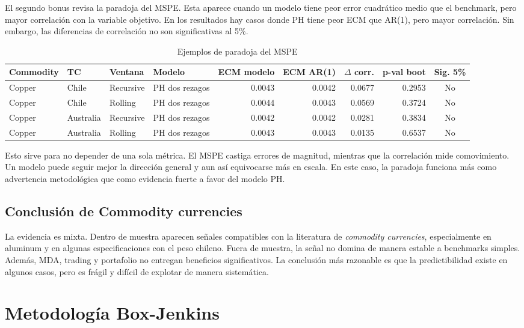 \documentclass[11pt,a4paper]{article}
\begin{document}
El segundo bonus revisa la paradoja del MSPE. Esta aparece cuando un modelo tiene peor error cuadrático medio que el benchmark, pero mayor correlación con la variable objetivo. En los resultados hay casos donde PH tiene peor ECM que AR(1), pero mayor correlación. Sin embargo, las diferencias de correlación no son significativas al 5\%.

\begin{table}[H]
\centering
\caption{Ejemplos de paradoja del MSPE}
\scriptsize
\begin{tabular}{llllrrrrc}
\toprule
Commodity & TC & Ventana & Modelo & ECM modelo & ECM AR(1) & $\Delta$ corr. & p-val boot & Sig. 5\% \\
\midrule
Copper & Chile & Recursive & PH dos rezagos & 0.0043 & 0.0042 & 0.0677 & 0.2953 & No \\
Copper & Chile & Rolling & PH dos rezagos & 0.0044 & 0.0043 & 0.0569 & 0.3724 & No \\
Copper & Australia & Recursive & PH dos rezagos & 0.0042 & 0.0042 & 0.0281 & 0.3834 & No \\
Copper & Australia & Rolling & PH dos rezagos & 0.0043 & 0.0043 & 0.0135 & 0.6537 & No \\
\bottomrule
\end{tabular}
\end{table}

Esto sirve para no depender de una sola métrica. El MSPE castiga errores de magnitud, mientras que la correlación mide comovimiento. Un modelo puede seguir mejor la dirección general y aun así equivocarse más en escala. En este caso, la paradoja funciona más como advertencia metodológica que como evidencia fuerte a favor del modelo PH.

\subsection{Conclusión de Commodity currencies}

La evidencia es mixta. Dentro de muestra aparecen señales compatibles con la literatura de \textit{commodity currencies}, especialmente en aluminum y en algunas especificaciones con el peso chileno. Fuera de muestra, la señal no domina de manera estable a benchmarks simples. Además, MDA, trading y portafolio no entregan beneficios significativos. La conclusión más razonable es que la predictibilidad existe en algunos casos, pero es frágil y difícil de explotar de manera sistemática.

\newpage
\section{Metodología Box-Jenkins}
\end{document}
